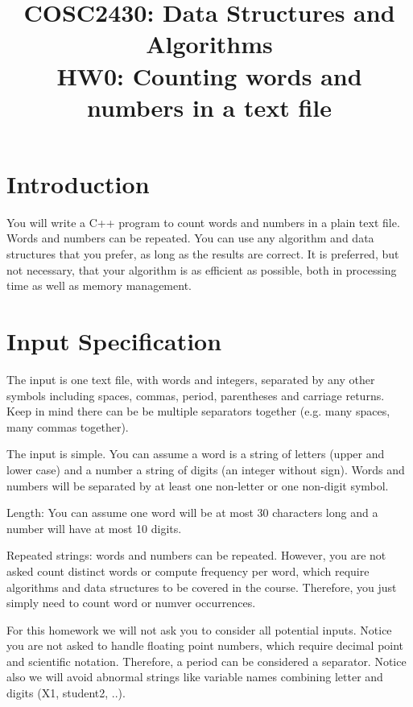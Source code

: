 

\title{COSC2430: Data Structures and Algorithms\\
HW0: Counting words and numbers in a text file
}

\date{}



\pagestyle{plain}
\let\thepage\relax  %

\maketitle

\section{Introduction}

You will write a C++ program to count words and numbers in a plain text file.
Words and numbers can be repeated.
You can use any algorithm and data structures that you prefer, as long as the results are correct. It is preferred, but not necessary, that your algorithm is as efficient as possible, both in processing time as well as memory management. 

\section{Input Specification}

The input is one text file, with words and integers, separated by any other symbols including
spaces, commas, period, parentheses and carriage returns.
Keep in mind there can be be multiple separators together (e.g. many spaces, many commas together).

The input is simple.
You can assume a word is a string of letters (upper and lower case) and a number a string of digits (an integer
without sign). Words and numbers will be separated by at least one non-letter or one non-digit symbol.

Length: You can assume one word will be at most 30 characters long
and a number will have at most 10 digits.

Repeated strings: words and numbers can be repeated. However, you are not asked count distinct words
or compute frequency per word, which require algorithms and data structures to be covered in the course.
Therefore, you just simply need to count word or numver occurrences.

For this homework we will not ask you to consider all potential inputs.
Notice you are not asked to handle floating point numbers, which require decimal point
and scientific notation. Therefore, a period can be considered a separator.
%
Notice also we will avoid abnormal strings like variable names combining letter and digits 
(X1, student2, ..).


